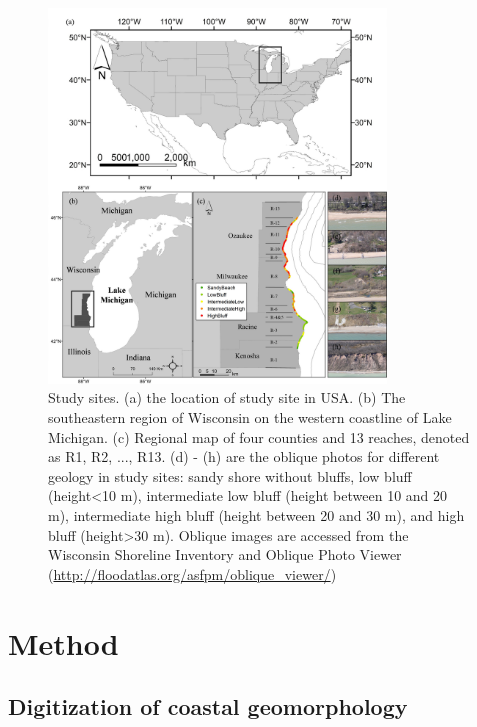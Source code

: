 

\begin{figure}[htbp] \centering
\includegraphics[width=0.8\textwidth]{chapter2/resources/figure2-1.jpg}
\caption{Study sites. (a) the location of study site in USA. (b) The
southeastern region of Wisconsin on the western coastline of Lake Michigan. (c)
Regional map of four counties and 13 reaches, denoted as R1, R2, ..., R13. (d) -
(h) are the oblique photos for different geology in study sites:  sandy shore
without bluffs, low bluff (height<10 m), intermediate low bluff (height between
10 and 20 m), intermediate high bluff (height between 20 and 30 m), and high
bluff (height>30 m). Oblique images are accessed from the Wisconsin Shoreline
Inventory and Oblique Photo Viewer
(\url{http://floodatlas.org/asfpm/oblique_viewer/})} \label{fig:fig2.1}
\end{figure}

\section{Method} 
\label{Method}

\subsection{Digitization of coastal geomorphology} \label{Digitization of
coastal geomorphology} 

